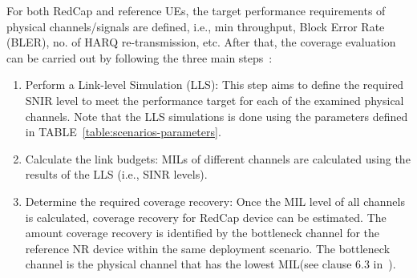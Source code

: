 \documentclass[]{IEEEtran}
\begin{document}
For both RedCap and reference UEs, the target performance requirements of physical channels/signals are defined, i.e., min throughput, Block Error Rate (BLER), no. of HARQ re-transmission, etc. 
After that, the coverage evaluation can be carried out by following the three main steps~\cite{moloudi_coverage_2021}:
\begin{enumerate}
    \item  Perform a Link-level Simulation (LLS): This step aims to define the required SNIR level to meet the performance target for each of the examined physical channels.
    Note that the LLS simulations is done using the parameters defined in TABLE~\ref{table:scenarios-parameters}.
    \item Calculate the link budgets: MILs of different channels are calculated using the results of the LLS (i.e., SINR levels).
    \item Determine the required coverage recovery: Once the MIL level of all channels is calculated, coverage recovery for RedCap device can be estimated.
    The amount coverage recovery is identified by the bottleneck channel for the reference NR device within the same deployment scenario.
    The bottleneck channel is the physical channel that has the lowest MIL(see clause 6.3 in~\cite{3gpp_study_2021_38.875}).
\end{enumerate}
\end{document}
